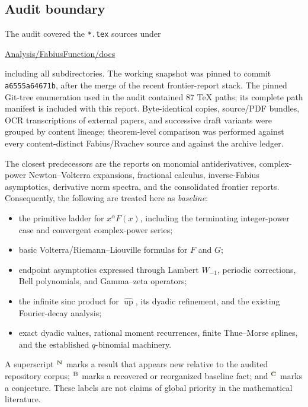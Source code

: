 \documentclass[11pt,oneside]{article}
\theoremstyle{definition}
\theoremstyle{remark}
\newcommand{\F}{F}
\newcommand{\G}{G}
\newcommand{\Up}{\operatorname{up}}
\newcommand{\tagnew}{\textsuperscript{\textcolor{oliveink}{\bfseries N}}}
\newcommand{\tagbase}{\textsuperscript{\textcolor{softgray}{\bfseries B}}}
\newcommand{\tagconj}{\textsuperscript{\textcolor{oliveink}{\bfseries C}}}
\begin{document}
\subsection{Audit boundary}

The audit covered the \texttt{*.tex} sources under
\begin{center}
\url{Analysis/FabiusFunction/docs}
\end{center}
including all subdirectories.  The working snapshot was pinned to commit
\texttt{a6555a64671b}, after the merge of the recent
frontier-report stack.  The pinned Git-tree enumeration used in the audit contained 87 TeX paths;
its complete path manifest is included with this report.  Byte-identical copies, source/PDF bundles, OCR transcriptions of external papers,
and successive draft variants were grouped by content lineage; theorem-level
comparison was performed against every content-distinct Fabius/Rvachev source
and against the archive ledger.

The closest predecessors are the reports on monomial antiderivatives,
complex-power Newton--Volterra expansions, fractional calculus, inverse-Fabius
asymptotics, derivative norm spectra, and the consolidated frontier reports.
Consequently, the following are treated here as \emph{baseline}:
\begin{itemize}
  \item the primitive ladder for \(x^\alpha\F(x)\), including the terminating
        integer-power case and convergent complex-power series;
  \item basic Volterra/Riemann--Liouville formulas for \(\F\) and \(\G\);
  \item endpoint asymptotics expressed through Lambert \(W_{-1}\), periodic
        corrections, Bell polynomials, and Gamma--zeta operators;
  \item the infinite sinc product for \(\widehat{\Up}\), its dyadic refinement,
        and the existing Fourier-decay analysis;
  \item exact dyadic values, rational moment recurrences, finite Thue--Morse
        splines, and the established \(q\)-binomial machinery.
\end{itemize}

A superscript \(\tagnew\) marks a result that appears new relative to the audited
repository corpus; \(\tagbase\) marks a recovered or reorganized baseline fact;
and \(\tagconj\) marks a conjecture.  These labels are not claims of global
priority in the mathematical literature.
\end{document}
